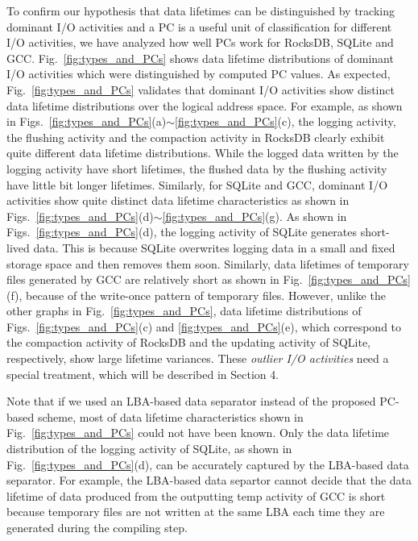 To confirm our hypothesis that data lifetimes can be distinguished by tracking
dominant I/O activities and a PC is a useful unit of classification for 
different I/O activities,
we have analyzed how well PCs work for RocksDB, SQLite and GCC.
Fig.~\ref{fig:types_and_PCs} shows data lifetime distributions of 
dominant I/O activities which were distinguished by computed PC values.
As expected, Fig.~\ref{fig:types_and_PCs} validates that dominant I/O activities 
show distinct data lifetime distributions over the logical address space.
For example, as shown in Figs.~\ref{fig:types_and_PCs}(a)$\sim$\ref{fig:types_and_PCs}(c), 
the logging activity, the flushing activity and the compaction activity 
in RocksDB clearly exhibit quite different data lifetime distributions.
While the logged data written by the logging activity have short lifetimes, 
the flushed data by the flushing activity have little bit longer lifetimes.  
Similarly, for SQLite and GCC, dominant I/O
activities show quite distinct data lifetime characteristics as shown in 
Figs.~\ref{fig:types_and_PCs}(d)$\sim$\ref{fig:types_and_PCs}(g).
As shown in Figs.~\ref{fig:types_and_PCs}(d), the logging activity of
SQLite generates short-lived data.  This is because SQLite overwrites logging
data in a small and fixed storage space and then removes them soon. 
Similarly,
data lifetimes of temporary files generated by GCC are 
relatively short as shown in Fig.~\ref{fig:types_and_PCs}(f),
because of the write-once pattern of temporary files.
{\color{blue}
However, unlike the other graphs in Fig.~\ref{fig:types_and_PCs}, data lifetime
distributions of Figs.~\ref{fig:types_and_PCs}(c) and \ref{fig:types_and_PCs}(e),
which correspond to the compaction activity of RocksDB and the updating activity of
SQLite, respectively, show large lifetime variances.
These {\it outlier I/O activities} need a special treatment, which 
will be described in Section 4.
}

Note that if we used an LBA-based data separator instead of the proposed PC-based scheme, 
most of data lifetime characteristics shown in Fig.~\ref{fig:types_and_PCs} could 
not have been known.  Only the data lifetime
distribution of the logging activity of SQLite, as shown in Fig.~\ref{fig:types_and_PCs}(d), 
can be accurately captured by the LBA-based data separator.  
For example, the LBA-based data separtor cannot 
decide that the data lifetime of data produced from the outputting temp activity of GCC 
is short because temporary files are not written at the same LBA
each time they are generated during the compiling step. 


